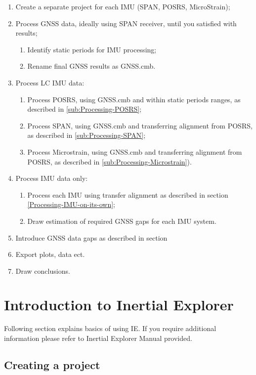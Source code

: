 \documentclass[british]{book}
\begin{document}
\begin{enumerate}
	\item Create a separate project for each IMU (SPAN,	POSRS, MicroStrain);
	\item Process GNSS data, ideally using SPAN receiver, until you satisfied with results;
	\begin{enumerate}
		\item Identify static periods for IMU processing;
		\item Rename final GNSS results as GNSS.cmb.
	\end{enumerate}
	\item Process LC IMU data:
	\begin{enumerate}
		\item Process POSRS, using GNSS.cmb and within static periods ranges, as described in \ref{sub:Processing-POSRS};
		\item Process SPAN, using GNSS.cmb and transferring alignment from POSRS, as described in \ref{sub:Processing-SPAN};
		\item Process Microstrain, using GNSS.cmb and transferring alignment from POSRS, as described in \ref{sub:Processing-Microstrain}).
	\end{enumerate}
	\item Process IMU data only:
	\begin{enumerate}
		\item Process each IMU using transfer alignment as described in section \ref{Processing-IMU-on-its-own};
		\item Draw estimation of required GNSS gaps for each IMU system.
	\end{enumerate}
	\item Introduce GNSS data gaps  as described in section %
	\item Export plots, data ect.
	\item Draw conclusions.
\end{enumerate}



\chapter{Introduction to Inertial Explorer}
Following section explains basics of using IE. If you require additional information please refer to Inertial Explorer Manual provided.



\section{Creating a project}\label{sec:Create-an-new}
\end{document}
